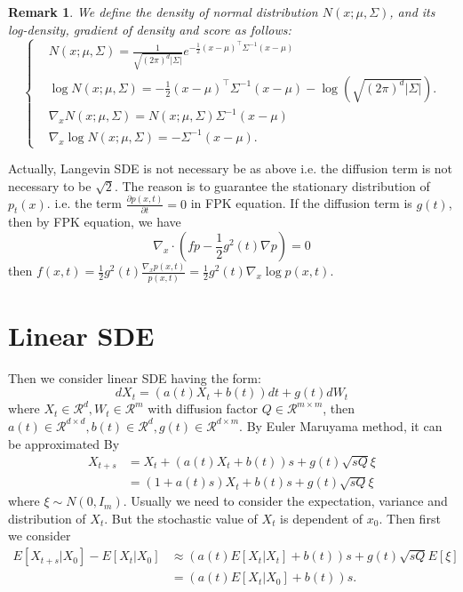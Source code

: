 \documentclass{article}
\newtheorem{remark}{Remark}
\begin{document}
\begin{remark}
    We define the density of normal distribution $N(x ; \mu, \Sigma)$, and its log-density, gradient of density and score as follows:
    \begin{equation}\left\{
        \begin{aligned}
            &N(x ; \mu, \Sigma)=\frac{1}{\sqrt{(2 \pi)^{d}|\Sigma|}} e^{-\frac{1}{2}(x-\mu)^{\top} \Sigma^{-1}(x-\mu)}\\
            &\log N(x ; \mu, \Sigma)=-\frac{1}{2}(x-\mu)^{\top} \Sigma^{-1}(x-\mu)-\log \left(\sqrt{(2 \pi)^{d}|\Sigma|}\right) . \\
            &\nabla_{x} N(x ; \mu, \Sigma)=N(x ; \mu, \Sigma)\Sigma^{-1}(x-\mu) \\
            &\nabla_{x} \log N(x ; \mu, \Sigma)=-\Sigma^{-1}(x-\mu) .
        \end{aligned}\right.
    \end{equation}
\end{remark}

Actually, Langevin SDE is not necessary be as above i.e. the diffusion term is not necessary to be $\sqrt{2}$. The reason is to guarantee the stationary distribution of $p_t(x)$.
i.e. the term $\frac{\partial p(x,t)}{\partial t}=0$ in FPK equation. If the diffusion term is $g(t)$, then by FPK equation, we have 
$$\nabla_x\cdot(fp-\frac{1}{2}g^2(t)\nabla p)=0$$
then $f(x,t) = \frac{1}{2}g^2(t)\frac{\nabla_x p(x, t)}{p(x,t)}=\frac{1}{2}g^2(t)\nabla_x\log p(x, t)$.

\section{Linear SDE}
Then we consider linear SDE having the form:
\begin{equation}
    dX_t = (a(t)X_t + b(t))dt + g(t)dW_t
\end{equation}
where $X_t\in \mathcal{R}^d, W_t\in \mathcal{R}^m$ with diffusion factor $Q\in \mathcal{R}^{m\times m}$, then $a(t)\in \mathcal{R}^{d\times d}, b(t)\in \mathcal{R}^d, g(t)\in \mathcal{R}^{d\times m}$. 
By Euler Maruyama method, it can be approximated By
\begin{equation}
    \begin{aligned}
        X_{t+s}&=X_t + (a(t)X_t + b(t))s+g(t)\sqrt{sQ}\xi\\
        &=(1+a(t)s)X_t + b(t)s + g(t)\sqrt{sQ}\xi
    \end{aligned}
\end{equation}
where $\xi\sim N(0, I_m)$. Usually we need to consider the expectation, variance and distribution of $X_t$. But the stochastic value of $X_t$ is dependent of $x_0$. Then first we consider
\begin{equation}
    \begin{aligned}
    E\left[X_{t+s} | X_{0}\right]-E\left[X_{t} | X_{0}\right] & \approx\left(a(t) E\left[X_{t} | X_{t}\right]+b(t)\right) s+g(t) \sqrt{sQ} E[\xi] \\
    & =\left(a(t) E\left[X_{t} | X_{0}\right]+b(t)\right) s .
    \end{aligned}
\end{equation}
\end{document}
